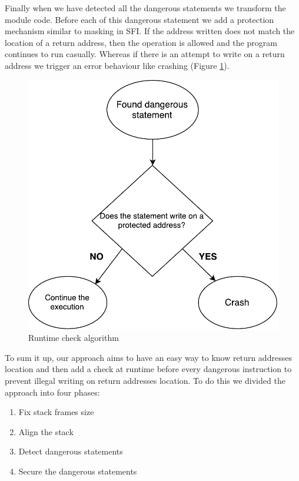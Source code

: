 \documentclass[11pt]{sdm}
\begin{document}
Finally when we have detected all the dangerous statements we transform the module code. Before each of this dangerous statement we add a protection mechanism similar to masking in SFI. If the address written does not match the location of a return address, then the operation is allowed and the program continues to run casually. Whereas if there is an attempt to write on a return address we trigger an error behaviour like crashing (Figure \ref{runtime_check}).

\begin{figure}
\centering
\includegraphics[scale=0.6]{images/runtime_check.pdf}
\caption{Runtime check algorithm}
\label{runtime_check}
\end{figure}

	To sum it up, our approach aims to have an easy way to know return addresses location and then add a check at runtime before every dangerous instruction to prevent illegal writing on return addresses location.
To do this we divided the approach into four phases:
\begin{enumerate}
	\item Fix stack frames size
	\item Align the stack
	\item Detect dangerous statements
	\item Secure the dangerous statements
\end{enumerate}
\end{document}
